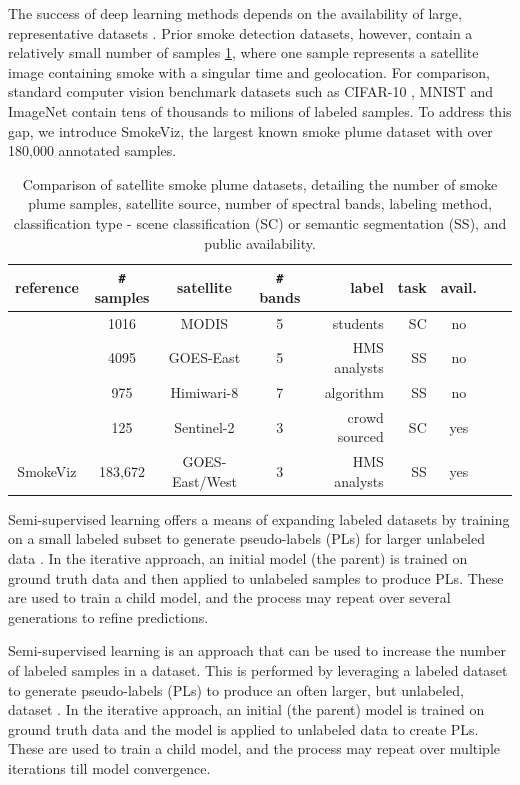 \documentclass{article}
\begin{document}
The success of deep learning methods depends on the availability of large, representative datasets \cite{data_size}. Prior smoke detection datasets, however, contain a relatively small number of samples \ref{studies}, where one sample represents a satellite image containing smoke with a singular time and geolocation. For comparison, standard computer vision benchmark datasets such as CIFAR-10 \cite{cifar}, MNIST \cite{mnist} and ImageNet \cite{imgnet} contain tens of thousands to milions of labeled samples. To address this gap, we introduce SmokeViz, the largest known smoke plume dataset with over 180,000 annotated samples.


\begin{table}[h]
    \caption{Comparison of satellite smoke plume datasets, detailing the number of smoke plume samples, satellite source, number of spectral bands, labeling method, classification type - scene classification (SC) or semantic segmentation (SS), and public availability.}\label{studies}
    \centering
    \begin{tabular}{ccccrrcrc}
        \toprule
        reference & \verb|#| samples & satellite & \verb|#| bands & label & task & avail.\\
        \midrule
        \cite{smokenet}& 1016 & MODIS & 5 & students & SC & no \\
        \cite{smoke_goes}& 4095 & GOES-East & 5 & HMS analysts & SS & no \\
        \cite{larsen} & 975 & Himiwari-8 & 7 & algorithm& SS & no \\
        \cite{satlas} & 125 & Sentinel-2 & 3 & crowd sourced & SC & yes \\
        SmokeViz  & 183,672 & GOES-East/West & 3 & HMS analysts & SS & yes \\
        \bottomrule
    \end{tabular}
\end{table}


Semi-supervised learning offers a means of expanding labeled datasets by training on a small labeled subset to generate pseudo-labels (PLs) for larger unlabeled data \cite{pseudo}. In the iterative approach, an initial model (the parent) is trained on ground truth data and then applied to unlabeled samples to produce PLs. These are used to train a child model, and the process may repeat over several generations to refine predictions.

Semi-supervised learning is an approach that can be used to increase the number of labeled samples in a dataset. This is performed by leveraging a labeled dataset to generate pseudo-labels (PLs) to produce an often larger, but unlabeled, dataset \cite{pseudo}. In the iterative approach, an initial (the parent) model is trained on ground truth data and the model is applied to unlabeled data to create PLs. These are used to train a child model, and the process may repeat over multiple iterations till model convergence. 
\end{document}
